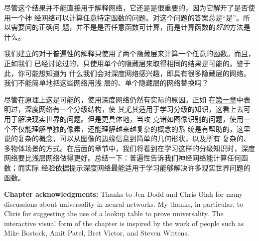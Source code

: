 尽管这个结果并不能直接用于解释网络，它还是是很重要的，因为它解开了是否使用一个神
经网络可以计算任意特定函数的问题。对这个问题的答案总是“是”。所以需要问的正确问
题，并不是是否任意函数可计算，而是计算函数的\emph{好的}方法是什么。

我们建立的对于普遍性的解释只使用了两个隐藏层来计算一个任意的函数。而且，正如我们
已经讨论过的，只使用单个的隐藏层来取得相同的结果是可能的。鉴于此，你可能想知道为
什么我们会对深度网络感兴趣，即具有很多隐藏层的网络。我们不能简单地把这些网络用浅
层的、单个隐藏层的网络替换吗？

尽管在原理上这是可能的，使用深度网络仍然有实际的原因。正如
在\hyperref[sec:toward_deep_learning]{第一章}中表明过，深度网络有一个分级结构，使
其尤其适用于学习分级的知识，这看上去可用于解决现实世界的问题。但是更具体地，当攻
克诸如图像识别的问题，使用一个不仅能理解单独的像素，还能理解越来越复杂的概念的系
统是有帮助的，这里说的复杂的概念，可以从图像的边缘信息到简单的几何形状，以及所有
复杂的、多物体场景的方式。在后面的章节中，我们将看到在学习这样的分级知识时，深度
网络要比浅层网络做得更好。总结一下：普遍性告诉我们神经网络能计算任何函数；而实际
经验依据提示深度网络最能适用于学习能够解决许多现实世界问题的函数。

\textbf{Chapter acknowledgments:} Thanks to Jen Dodd and Chris Olah for many
discussions about universality in neural networks. My thanks, in particular, to
Chris for suggesting the use of a lookup table to prove universality. The
interactive visual form of the chapter is inspired by the work of people such as
Mike Bostock, Amit Patel, Bret Victor, and Steven Wittens.
